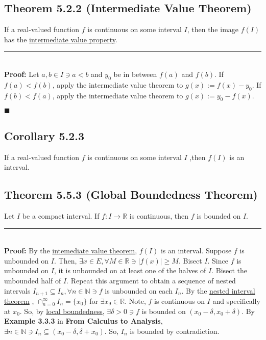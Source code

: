 \documentclass[11pt]{book}
\newcommand{\R}{\mathbb{R}}
\newcommand{\N}{\mathbb{N}}
\newcommand{\horline}{\noindent\rule{14.25cm}{0.6pt}\\}
\newcounter{theorem}
\newcommand{\QED}{\begin{flushright}$\blacksquare$\end{flushright}}
\begin{document}
	\subsection{Theorem 5.2.2 (Intermediate Value Theorem)}
	\label{subsec:theor522}
		\begin{theor}
			If a real-valued function $f$ is continuous on some interval $I$, then the image $f(I)$ has the \hyperref[subsec:intermediatevalueproperty]{intermediate value property}.\hfill\break
			\horline
			\textbf{Proof:} Let $a,b \in I \ni a<b$ and $y_0$ be in between $f(a)$ and $f(b)$. If $f(a) < f(b)$, apply the intermediate value theorem to $g(x) := f(x) - y_0$. 
			If $f(b) < f(a)$, apply the intermediate value theorem to $g(x) := y_0 - f(x)$. \QED
		\end{theor}
	\newpage		

	\subsection{Corollary 5.2.3}
	\label{subsec:cor523}
		\begin{cor}
			If a real-valued function $f$ is continuous on some interval $I$ ,then $f(I)$ is an interval.
		\end{cor}

	\subsection{Theorem 5.5.3 (Global Boundedness Theorem)}
	\label{subsec:GBT}
		\begin{theor}
			Let $I$ be a compact interval. If $f: I \to \R$ is continuous, then $f$ is bounded on $I$.\hfill\break
			\horline
			\textbf{Proof:} By the \hyperref[subsec:theor522]{intemediate value theorem}, $f(I)$ is an interval. Suppose $f$ is unbounded on $I$. Then, $\exists x \in E, 
			\forall M \in \R \ni  |f(x)| \geq M$.\hfill\break
			Bisect $I$. Since $f$ is unbounded on $I$, it is unbounded on at least one of the halves of $I$. Bisect the unbounded half of $I$. Repeat this argument
			to obtain a sequence of nested intervals $I_{n+1} \subseteq I_n, \forall n \in \N \ni f$ is unbounded on each $I_n$. By the \hyperref[subsec:theor332]{nested interval theorem}
			, $\displaystyle\cap_{n = 0}^{\infty}{I_n} = \{x_0\}$ for $\exists x_9 \in \R$. Note, $f$ is continuous on $I$ and specifically at $x_0$. So, by 
			\hyperref[subsec:theor1312]{local boundedness}, $\exists \delta > 0 \ni f$ is bounded on $(x_0 - \delta, x_0 + \delta)$. By \textbf{Example 3.3.3} in
			\textbf{From Calculus to Analysis}, $\exists n \in \N \ni I_n \subseteq (x_0 - \delta, \delta + x_0)$. So, $I_n$ is bounded by contradiction.
		\end{theor}
	\newpage	
\end{document}

